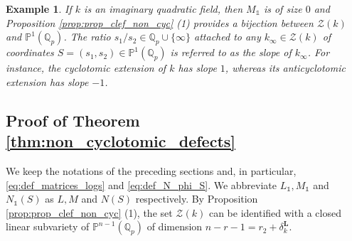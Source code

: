 \documentclass[12pt]{amsart}
\newcommand\bP{\mathbb{P}}
\newcommand\Qp{{\mathbb{Q}_p}}
\newcommand\sZ{\mathscr{Z}}
\theoremstyle{defstyle}
\newtheorem{exemple}[subsubsection]{Example}
\theoremstyle{thmstyle}
\begin{document}
	\begin{exemple}\label{ex:slope}
		If $k$ is an imaginary quadratic field, then $M_\mathds{1}$ is of size $0$ and Proposition \ref{prop:prop_clef_non_cyc} (1) provides a bijection between $\sZ(k)$ and $\bP^1(\Qp)$. The ratio ${s_1}/{s_2}\in \Qp \cup \{\infty\}$ attached to any $k_\infty\in \sZ(k)$ of coordinates $S=(s_1,s_2)\in \bP^1(\Qp)$ is referred to as the \emph{slope} of $k_\infty$. For instance, the cyclotomic extension of $k$ has slope $1$, whereas its anticyclotomic extension has slope $-1$.
	\end{exemple}
	
	\subsection{Proof of Theorem \ref{thm:non_cyclotomic_defects}}
	We keep the notations of the preceding sections and, in particular,  \eqref{eq:def_matrices_logs} and \eqref{eq:def_N_phi_S}. We abbreviate $L_\mathds{1}, M_\mathds{1}$ and $N_\mathds{1}(S)$ as $L,M$ and $N(S)$ respectively. By Proposition \ref{prop:prop_clef_non_cyc} (1), the set $\sZ(k)$ can be identified with a closed linear subvariety of $\bP^{n-1}(\Qp)$ of dimension $n-r-1=r_2+\delta^\textbf{L}_k$.  
	
\end{document}
